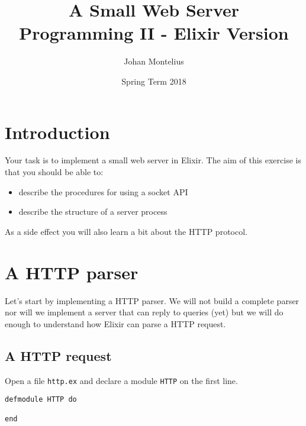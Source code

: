 \documentclass[a4paper,11pt]{article}
\begin{document}

\title{
    \textbf{A Small Web Server}\\
    \large{Programming II - Elixir Version}
}
\author{Johan Montelius}
\date{Spring Term 2018}
\maketitle
\thispagestyle{fancy}



\section*{Introduction}

Your task is to implement a small web server in Elixir. The aim of
this exercise is that you should be able to:

\begin{itemize}
\item describe the procedures for using a socket API
\item describe the structure of a server process
\end{itemize}

As a side effect you will also learn a bit about the HTTP protocol.



\section{A HTTP parser}

Let's start by implementing a HTTP parser. We will not build a
complete parser nor will we implement a server that can reply to 
queries (yet) but we will do enough to understand how Elixir can 
parse a HTTP request.

\subsection{A HTTP request}
Open a file {\tt http.ex} and declare a module {\tt HTTP} on the
first line.

\begin{verbatim}
defmodule HTTP do
  
end
\end{verbatim}
\end{document}
